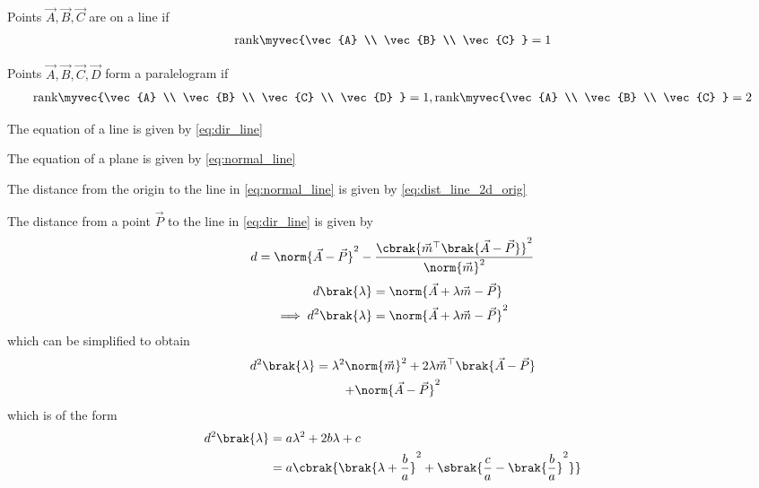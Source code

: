 \item Points $\vec{A}, \vec{B}, \vec{C}$ are on a line if 
\begin{align}
  \label{eq:line_rank}
  \text{rank}\myvec{\vec{A} \\ \vec{B} \\ \vec{C} }  = 1
\end{align}
\item Points $\vec{A}, \vec{B}, \vec{C}, \vec{D}$ form a paralelogram if 
\begin{align}
  \label{eq:parallelgm_rank}
  \text{rank}\myvec{\vec{A} \\ \vec{B} \\ \vec{C} \\ \vec{D}  }  = 1, 
  \text{rank}\myvec{\vec{A} \\ \vec{B} \\ \vec{C} }  = 2
\end{align}
\item The equation of a line  is given by  
	\eqref{eq:dir_line}
	\item The equation of a plane is given by
	\eqref{eq:normal_line}
	\item The distance from the origin to the line  in 
	\eqref{eq:normal_line}
	is given by 
	\eqref{eq:dist_line_2d_orig}
\item The distance from a point $\vec{P}$  to the line in 
	\eqref{eq:dir_line} is given by 
\begin{align}
	\label{dist_3d_def_final}
		d = \norm{\vec{A} -\vec{P}}^2 - \frac{\cbrak{\vec{m}^{\top}\brak{\vec{A}-\vec{P} 
	}}^2}{\norm{\vec{m}}^2}
		\end{align}
		\solution
\begin{align}
	\label{dist_3d_def}
	d\brak{\lambda } &=\norm{\vec{A} + \lambda \vec{m}-\vec{P}}
	\\
\implies 	d^2\brak{\lambda } &=\norm{\vec{A} + \lambda \vec{m}-\vec{P}}^2
\end{align}
which can be simplified to obtain 
	\begin{multline}
d^2\brak{\lambda } =\lambda^2 \norm{\vec{m}}^2+2\lambda \vec{m}^{\top}\brak{\vec{A} 
		-\vec{P}}
		\\
		+\norm{\vec{A} -\vec{P}}^2
	\end{multline}
which is of the form 
\begin{align}
	\label{dist_3d_def_quad}
	d^2\brak{\lambda } &=a \lambda^2 + 2b\lambda +c
	\\
	&=a \cbrak{\brak{\lambda+ \frac{b}{a}}^2 +\sbrak{\frac{c}{a}-\brak{\frac{b}{a}}^2 }}
\end{align}
